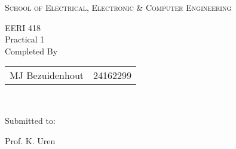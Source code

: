 

\begin{titlepage}



\begin{center}
\large

\hfill
\vfill
\vspace{5mm}

\begingroup
\Huge{\textsc{School of Electrical, Electronic \& Computer Engineering}} \\ \bigskip %

\Huge{EERI 418}\\
\Large{Practical 1}\\
\endgroup
\vspace{15mm}
\Large{Completed By} \\

 \begin{tabular}{l  r} 
 MJ Bezuidenhout & 24162299 \\

 \end{tabular}			\\
 
\vfill

Submitted to:\\
\vspace{8mm}




Prof. K. Uren\\
\vfill



\myTime

			
\vspace*{0.8cm}

\vfill

\end{center}

\end{titlepage}
